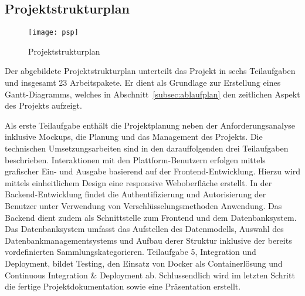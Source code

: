 \subsection{Projektstrukturplan}\label{subsec:projektstrukturplan}

\begin{figure}[H]
    \centering
    \texttt{[image: psp]}
    \caption{Projektstrukturplan}\label{fig:projektstrukturplan}
\end{figure}

Der abgebildete Projektstrukturplan unterteilt das Projekt in sechs Teilaufgaben und insgesamt 23 Arbeitspakete.
Er dient als Grundlage zur Erstellung eines Gantt-Diagramms, welches in Abschnitt~\ref{subsec:ablaufplan} den zeitlichen Aspekt des Projekts aufzeigt.

Als erste Teilaufgabe enthält die Projektplanung neben der Anforderungsanalyse inklusive Mockups, die Planung und das Management des Projekts.
Die technischen Umsetzungsarbeiten sind in den darauffolgenden drei Teilaufgaben beschrieben.
Interaktionen mit den Plattform-Benutzern erfolgen mittels grafischer Ein- und Ausgabe basierend auf der Frontend-Entwicklung.
Hierzu wird mittels einheitlichem Design eine responsive Weboberfläche erstellt.
In der Backend-Entwicklung findet die Authentifizierung und Autorisierung der Benutzer unter Verwendung von Verschlüsselungsmethoden Anwendung.
Das Backend dient zudem als Schnittstelle zum Frontend und dem Datenbanksystem.
Das Datenbanksystem umfasst das Aufstellen des Datenmodells, Auswahl des Datenbankmanagementsystems und Aufbau derer Struktur inklusive der bereits vordefinierten Sammlungskategorieren.
Teilaufgabe 5, Integration und Deployment, bildet Testing, den Einsatz von Docker als Containerlösung und Continuous Integration \& Deployment ab.
Schlussendlich wird im letzten Schritt die fertige Projektdokumentation sowie eine Präsentation erstellt.


